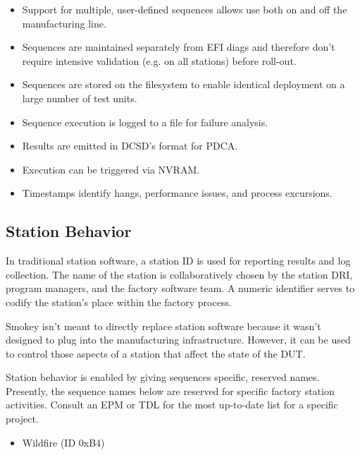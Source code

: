 \documentclass[11pt]{article}
\begin{document}
\begin{itemize}

\item Support for multiple, user-defined sequences allows use both on and off
	the manufacturing line.

\item Sequences are maintained separately from EFI diags and therefore don't
	require intensive validation (e.g. on all stations) before roll-out.

\item Sequences are stored on the filesystem to enable identical deployment on
	a large number of test units.

\item Sequence execution is logged to a file for failure analysis.

\item Results are emitted in DCSD's format for PDCA.

\item Execution can be triggered via NVRAM.

\item Timestamps identify hangs, performance issues, and process excursions.

\end{itemize}

\subsection{Station Behavior}

In traditional station software, a station ID is used for reporting results and
log collection.  The name of the station is collaboratively chosen by the
station DRI, program managers, and the factory software team.  A numeric
identifier serves to codify the station's place within the factory process.

Smokey isn't meant to directly replace station software because it wasn't
designed to plug into the manufacturing infrastructure.  However, it can be
used to control those aspects of a station that affect the state of the DUT.

Station behavior is enabled by giving sequences specific, reserved names.
Presently, the sequence names below are reserved for specific factory station
activities.  Consult an EPM or TDL for the most up-to-date list for a specific
project.

\begin{itemize}

\item Wildfire (ID 0xB4)

\end{itemize}
\end{document}
